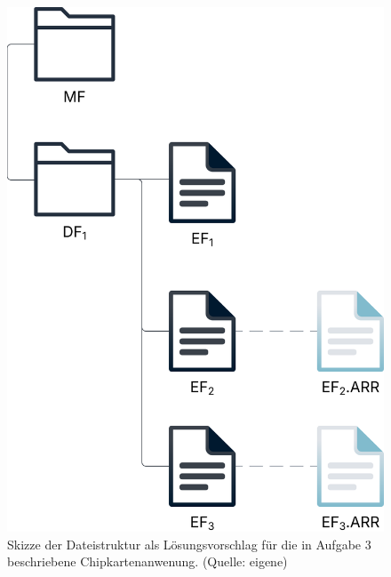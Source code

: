 \begin{figure}
    \centering
    \includegraphics[scale=0.4]{aufgabe 3/img/struktur.svg}
    \caption{Skizze der Dateistruktur als Lösungsvorschlag für die in Aufgabe 3 beschriebene Chipkartenanwenung. (Quelle: eigene)}
    \label{fig:struktur}
\end{figure}